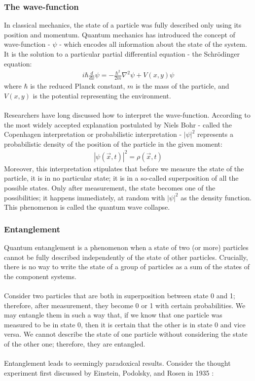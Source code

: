 \subsubsection{The wave-function}
In classical mechanics, the state of a particle was fully described only using its position and momentum. Quantum mechanics has introduced the concept of wave-function - $\psi$ - which encodes all information about the state of the system. It is the solution to a particular partial differential equation - the Schrödinger equation:
\begin{align*}
  i \hbar \frac{d}{dx} \psi=-\frac{\hbar^2}{2m}\nabla^2 \psi + V(x,y)\psi 
\end{align*}
where $\hbar$ is the reduced Planck constant, $m$ is the mass of the particle, and $V(x,y)$ is the potential representing the environment.\\\\
Researchers have long discussed how to interpret the wave-function. According to the most widely accepted explanation postulated by Niels Bohr - called the Copenhagen interpretation or probabilistic interpretation - $|\psi|^2$ represents a probabilistic density of the position of the particle in the given moment:
\begin{align*}
  |\psi(\vec{x},t)|^2=\rho(\vec{x},t)
\end{align*}
Moreover, this interpretation stipulates that before we measure the state of the particle, it is in no particular state; it is in a so-called superposition of all the possible states. Only after measurement, the state becomes one of the possibilities; it happens immediately, at random with $|\psi|^2$ as the density function. This phenomenon is called the quantum wave collapse.\\

\subsubsection{Entanglement}
Quantum entanglement is a phenomenon when a state of two (or more) particles cannot be fully described independently of the state of other particles. Crucially, there is no way to write the state of a group of particles as a sum of the states of the component systems. \\\\
Consider two particles that are both in superposition between state 0 and 1; therefore, after measurement, they become 0 or 1 with certain probabilities. We may entangle them in such a way that, if we know that one particle was measured to be in state 0, then it is certain that the other is in state 0 and vice versa. We cannot describe the state of one particle without considering the state of the other one; therefore, they are entangled.\\\\
Entanglement leads to seemingly paradoxical results. Consider the thought experiment first discussed by Einstein, Podolsky, and Rosen in 1935 \cite{epr}:
